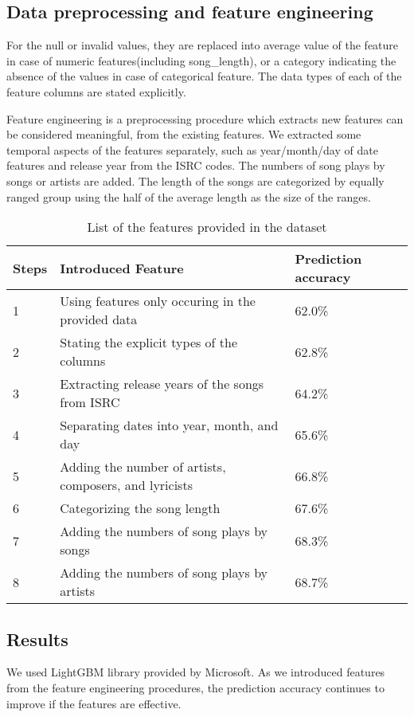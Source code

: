 \documentclass{article}
\begin{document}
\subsection{Data preprocessing and feature engineering}
For the null or invalid values, they are replaced into average value of the
feature in case of numeric features(including song\_length), or a category
indicating the absence of the values in case of categorical feature. The
data types of each of the feature columns are stated explicitly.

Feature engineering is a preprocessing procedure which extracts new
features can be considered meaningful, from the existing features. We extracted
some temporal aspects of the features separately, such as year/month/day of date
features and release year from the ISRC codes. The numbers of song plays by
songs or artists are added. The length of the songs are categorized by equally
ranged group using the half of the average length as the size of the ranges.

\begin{table}[!h]
\centering
\begin{tabular}{|l|l|l|}
\hline \rowcolor[HTML]{C0C0C0}
Steps & Introduced Feature & Prediction accuracy \\\hline
1 & Using features only occuring in the provided data & 62.0\% \\\hline
2 &	Stating the explicit types of the columns & 62.8\% \\\hline
3 & Extracting release years of the songs from ISRC & 64.2\% \\\hline
4 & Separating dates into year, month, and day & 65.6\% \\\hline
5 & Adding the number of artists, composers, and lyricists & 66.8\% \\\hline
6 & Categorizing the song length & 67.6\% \\\hline
7 & Adding the numbers of song plays by songs & 68.3\% \\\hline
8 & Adding the numbers of song plays by artists & 68.7\% \\\hline
\end{tabular}
\caption{List of the features provided in the dataset}
\label{table:gbmfeatureengineering}
\end{table}

\subsection{Results}
We used LightGBM library provided by Microsoft. As we introduced features from
the feature engineering procedures, the prediction accuracy continues to improve if the features are effective.
\end{document}
